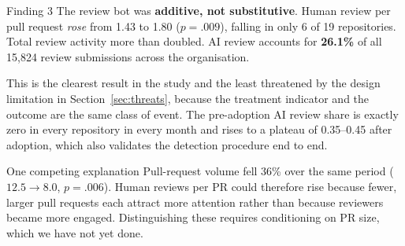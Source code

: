 \documentclass[11pt,a4paper]{article}
\begin{document}
\begin{findingbox}{Finding 3}
The review bot was \textbf{additive, not substitutive}. Human review per pull
request \emph{rose} from 1.43 to 1.80 ($p=.009$), falling in only 6 of 19
repositories. Total review activity more than doubled. AI review accounts for
\textbf{26.1\%} of all 15,824 review submissions across the organisation.
\end{findingbox}

This is the clearest result in the study and the least threatened by the design
limitation in Section~\ref{sec:threats}, because the treatment indicator and
the outcome are the same class of event. The pre-adoption AI review share is
exactly zero in every repository in every month and rises to a plateau of
0.35--0.45 after adoption, which also validates the detection procedure end to
end.

\begin{cautionbox}{One competing explanation}
Pull-request volume fell 36\% over the same period ($12.5 \to 8.0$, $p=.006$).
Human reviews per PR could therefore rise because fewer, larger pull requests
each attract more attention rather than because reviewers became more engaged.
Distinguishing these requires conditioning on PR size, which we have not yet
done.
\end{cautionbox}

\label{sec:threats}
\end{document}

